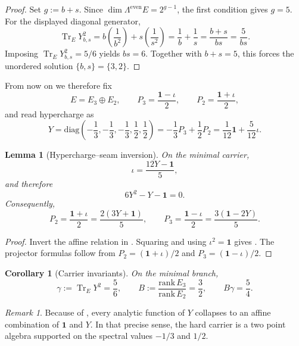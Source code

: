 \documentclass[11pt,a4paper]{article}
\newtheorem{corollary}[theorem]{Corollary}
\newtheorem{lemma}[theorem]{Lemma}
\theoremstyle{definition}
\theoremstyle{remark}
\newtheorem*{remark}{Remark}
\DeclareMathOperator{\tr}{Tr}
\newcommand{\inv}{\iota}
\newcommand{\gammaY}{\gamma}
\numberwithin{equation}{section}
\begin{document}
\begin{proof}
Set $g := b+s$. Since $\dim \Lambda^{\mathrm{even}}E = 2^{g-1}$, the first condition gives $g=5$.
For the displayed diagonal generator,
\[
\tr_E Y_{b,s}^2
=
b\left(\frac1{b^2}\right)+s\left(\frac1{s^2}\right)
=
\frac1b+\frac1s
=
\frac{b+s}{bs}
=
\frac{5}{bs}.
\]
Imposing $\tr_E Y_{b,s}^2 = 5/6$ yields $bs=6$. Together with $b+s=5$, this forces the unordered
solution $\{b,s\}=\{3,2\}$.
\end{proof}

From now on we therefore fix
\[
E = E_3 \oplus E_2,
\qquad
P_3 = \frac{\mathbf 1-\inv}{2},
\qquad
P_2 = \frac{\mathbf 1+\inv}{2},
\]
and read hypercharge as
\begin{equation}
\label{eq:hypercharge}
Y
=
\mathrm{diag}\!\left(-\frac13,-\frac13,-\frac13,\frac12,\frac12\right)
=
-\frac13 P_3+\frac12 P_2
=
\frac1{12}\mathbf 1+\frac5{12}\inv.
\end{equation}

\begin{lemma}[Hypercharge--seam inversion]
\label{lem:hypercharge-seam}
On the minimal carrier,
\begin{equation}
\label{eq:seam-inversion}
\inv = \frac{12Y-\mathbf 1}{5},
\end{equation}
and therefore
\begin{equation}
\label{eq:carrier-polynomial}
6Y^2 - Y - \mathbf 1 = 0.
\end{equation}
Consequently,
\[
P_2 = \frac{\mathbf 1+\inv}{2} = \frac{2(3Y+\mathbf 1)}{5},
\qquad
P_3 = \frac{\mathbf 1-\inv}{2} = \frac{3(\mathbf 1-2Y)}{5}.
\]
\end{lemma}

\begin{proof}
Invert the affine relation in . Squaring  and using
$\inv^2=\mathbf 1$ gives . The projector formulas follow from
$P_2=(\mathbf 1+\inv)/2$ and $P_3=(\mathbf 1-\inv)/2$.
\end{proof}

\begin{corollary}[Carrier invariants]
\label{cor:carrier-invariants}
On the minimal branch,
\[
\gammaY := \tr_E Y^2 = \frac56,
\qquad
B := \frac{\mathrm{rank}\,E_3}{\mathrm{rank}\,E_2} = \frac32,
\qquad
B\gammaY = \frac54.
\]
\end{corollary}

\begin{remark}
Because of , every analytic function of $Y$ collapses to an affine
combination of $\mathbf 1$ and $Y$. In that precise sense, the hard carrier is a two point algebra
supported on the spectral values $-1/3$ and $1/2$.
\end{remark}
\end{document}
